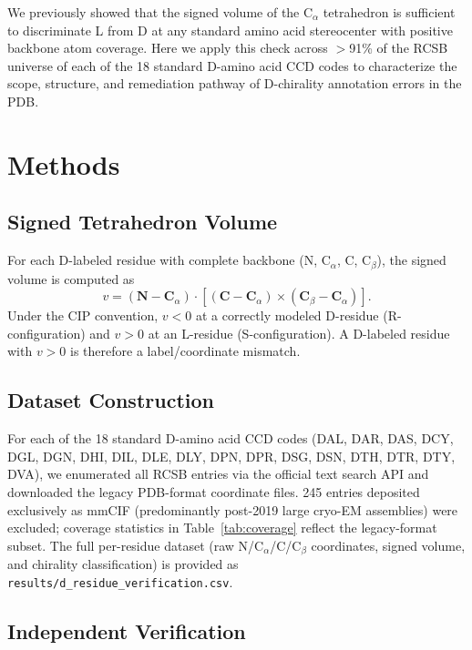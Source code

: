\documentclass[11pt]{article}
\begin{document}
We previously showed \citep{hovmoller2002} that the signed volume of the C$_\alpha$ tetrahedron is sufficient to discriminate L from D at any standard amino acid stereocenter with positive backbone atom coverage. Here we apply this check across $>$91\% of the RCSB universe of each of the 18 standard D-amino acid CCD codes to characterize the scope, structure, and remediation pathway of D-chirality annotation errors in the PDB.

\section{Methods}

\subsection{Signed Tetrahedron Volume}

For each D-labeled residue with complete backbone (N, C$_\alpha$, C, C$_\beta$), the signed volume is computed as
\begin{equation}
v = (\mathbf{N} - \mathbf{C}_\alpha) \cdot \left[ (\mathbf{C} - \mathbf{C}_\alpha) \times (\mathbf{C}_\beta - \mathbf{C}_\alpha) \right].
\end{equation}
Under the CIP convention, $v < 0$ at a correctly modeled D-residue (R-configuration) and $v > 0$ at an L-residue (S-configuration). A D-labeled residue with $v > 0$ is therefore a label/coordinate mismatch.

\subsection{Dataset Construction}

For each of the 18 standard D-amino acid CCD codes (DAL, DAR, DAS, DCY, DGL, DGN, DHI, DIL, DLE, DLY, DPN, DPR, DSG, DSN, DTH, DTR, DTY, DVA), we enumerated all RCSB entries via the official text search API and downloaded the legacy PDB-format coordinate files. 245 entries deposited exclusively as mmCIF (predominantly post-2019 large cryo-EM assemblies) were excluded; coverage statistics in Table~\ref{tab:coverage} reflect the legacy-format subset. The full per-residue dataset (raw N/C$_\alpha$/C/C$_\beta$ coordinates, signed volume, and chirality classification) is provided as \texttt{results/d\_residue\_verification.csv}.

\subsection{Independent Verification}
\end{document}
